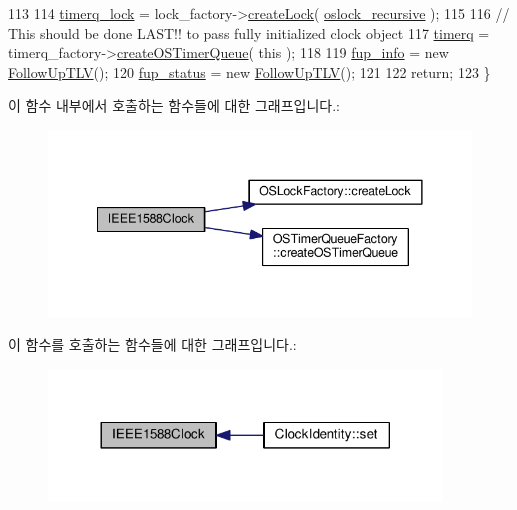 \begin{DoxyCode}
113 
114     \hyperlink{class_i_e_e_e1588_clock_ad5be8ae90ecd7c06aafab66d0d02b4b8}{timerq\_lock} = lock\_factory->\hyperlink{class_o_s_lock_factory_ac0789ff714468962f0c1a317d7774585}{createLock}( 
      \hyperlink{avbts__oslock_8hpp_a88e6fcd587e202a0bf3d0318d8fff8bbafd42ae3474dea6ba3413104730fb1063}{oslock\_recursive} );
115 
116     \textcolor{comment}{// This should be done LAST!! to pass fully initialized clock object}
117     \hyperlink{class_i_e_e_e1588_clock_a1e7ff34593ba8567fd2b6bbd988db63e}{timerq} = timerq\_factory->\hyperlink{class_o_s_timer_queue_factory_a6ef36ae2e4e33a6683ee412f06af7a85}{createOSTimerQueue}( \textcolor{keyword}{this} );
118 
119     \hyperlink{class_i_e_e_e1588_clock_a9df8b5f3401b8f4ad34dfb75c956d008}{fup\_info} = \textcolor{keyword}{new} \hyperlink{class_follow_up_t_l_v}{FollowUpTLV}();
120     \hyperlink{class_i_e_e_e1588_clock_aaf00539b688a0556fd64ed67d46baea8}{fup\_status} = \textcolor{keyword}{new} \hyperlink{class_follow_up_t_l_v}{FollowUpTLV}();
121 
122     \textcolor{keywordflow}{return};
123 \}
\end{DoxyCode}


이 함수 내부에서 호출하는 함수들에 대한 그래프입니다.\+:
\nopagebreak
\begin{figure}[H]
\begin{center}
\leavevmode
\includegraphics[width=341pt]{class_i_e_e_e1588_clock_a328d778afa9cc4f6a05eaa8b45bd120b_cgraph}
\end{center}
\end{figure}




이 함수를 호출하는 함수들에 대한 그래프입니다.\+:
\nopagebreak
\begin{figure}[H]
\begin{center}
\leavevmode
\includegraphics[width=296pt]{class_i_e_e_e1588_clock_a328d778afa9cc4f6a05eaa8b45bd120b_icgraph}
\end{center}
\end{figure}


